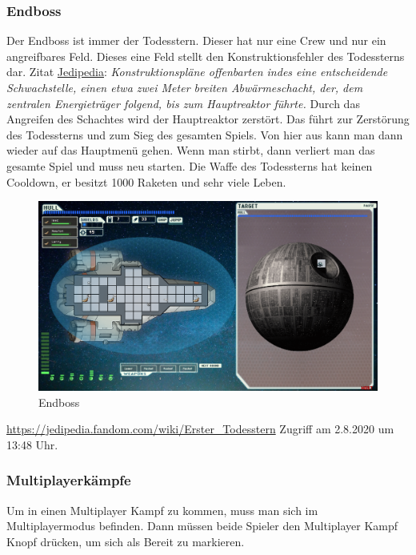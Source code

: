 \documentclass[fontsize=12pt,paper=a4,twoside]{scrartcl}
\begin{document}
\subsubsection{Endboss}

Der Endboss ist immer der Todesstern. Dieser hat nur eine Crew und nur ein angreifbares Feld. Dieses eine Feld stellt den Konstruktionsfehler des Todessterns dar. Zitat \href{https://jedipedia.fandom.com/wiki/Erster_Todesstern}{Jedipedia}: \textit{\glqq Konstruktionspläne offenbarten indes eine entscheidende Schwachstelle, einen etwa zwei Meter breiten Abwärmeschacht, der, dem zentralen Energieträger folgend, bis zum Hauptreaktor führte.\grqq} Durch das Angreifen des Schachtes wird der Hauptreaktor zerstört. Das führt zur Zerstörung des Todessterns und zum Sieg des gesamten Spiels. Von hier aus kann man dann wieder auf das Hauptmenü gehen. Wenn man stirbt, dann verliert man das gesamte Spiel und muss neu starten. Die Waffe des Todessterns hat keinen Cooldown, er besitzt 1000 Raketen und sehr viele Leben. 

\begin{figure}[H]
\centering
\includegraphics[width=1\linewidth]{DasSpiel/Kampf/endboss.png}
\caption{Endboss}
\end{figure}


\url{https://jedipedia.fandom.com/wiki/Erster_Todesstern} Zugriff am 2.8.2020 um 13:48 Uhr.

\subsubsection{Multiplayerkämpfe}

Um in einen Multiplayer Kampf zu kommen, muss man sich im Multiplayermodus befinden. Dann müssen beide Spieler den Multiplayer Kampf Knopf drücken, um sich als Bereit zu markieren. 
\end{document}
